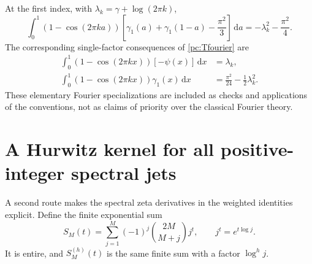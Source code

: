 \documentclass[11pt,a4paper]{article}
\numberwithin{equation}{section}
\theoremstyle{definition}
\newcommand{\dd}{\,\mathrm dx}
\newcommand{\da}{\,\mathrm da}
\begin{document}
At the first index, with $\lambda_k=\gamma+\log(2\pi k)$,
\begin{equation}\label{pc:Jweightedexample}
 \int_0^1(1-\cos(2\pi ka))
 \left[\gamma_1(a)+\gamma_1(1-a)-\frac{\pi^2}{3}\right]\da
 =-\lambda_k^2-\frac{\pi^2}{4}.
\end{equation}
The corresponding single-factor consequences of \eqref{pc:Tfourier} are
\begin{align}
 \int_0^1(1-\cos(2\pi kx))[-\psi(x)]\dd&=\lambda_k,\label{pc:single0}\\
 \int_0^1(1-\cos(2\pi kx))\gamma_1(x)\dd
 &=\frac{\pi^2}{24}-\frac12\lambda_k^2.\label{pc:single1}
\end{align}
These elementary Fourier specializations are included as checks and applications of the conventions, not as claims of priority over the classical Fourier theory.

\section{A Hurwitz kernel for all positive-integer spectral jets}\label{pc:Hurwitzweighted}
A second route makes the spectral zeta derivatives in the weighted identities explicit. Define the finite exponential sum
\begin{equation}\label{pc:SM}
 S_M(t)=\sum_{j=1}^M(-1)^j\binom{2M}{M+j}j^t,
 \qquad j^t=e^{t\log j}.
\end{equation}
It is entire, and $S_M^{(h)}(t)$ is the same finite sum with a factor $\log^h j$.
\end{document}
